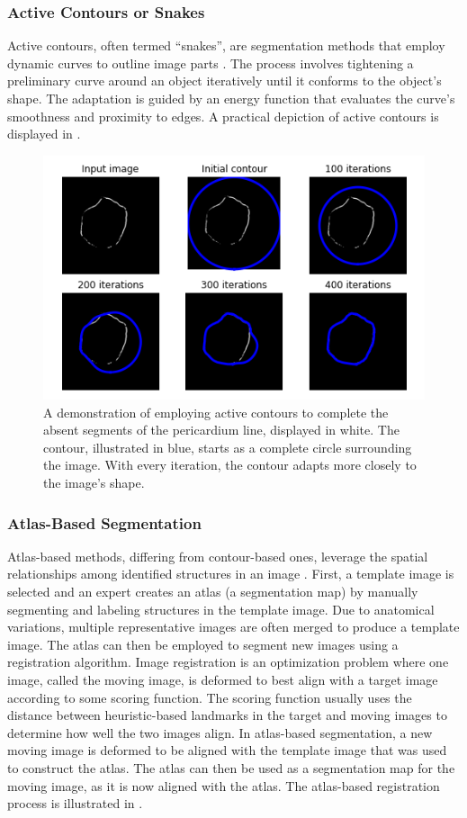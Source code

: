 \subsubsection{Active Contours or Snakes}

Active contours, often termed ``snakes'', are segmentation methods that employ dynamic curves to outline image parts \citep{Kass1988}. The process involves tightening a preliminary curve around an object iteratively until it conforms to the object's shape. The adaptation is guided by an energy function that evaluates the curve's smoothness and proximity to edges. A practical depiction of active contours is displayed in .

 \begin{figure}[h!]
 \centering
 \includegraphics[width=0.65\linewidth]{images/active_contour.png}
 \caption{A demonstration of employing active contours to complete the absent segments of the pericardium line, displayed in white. The contour, illustrated in blue, starts as a complete circle surrounding the image. With every iteration, the contour adapts more closely to the image's shape. \cite{bencevicRecentProgressEpicardial2022}}
 \label{fig:active-contour}
 \end{figure}

\subsubsection{Atlas-Based Segmentation}

Atlas-based methods, differing from contour-based ones, leverage the spatial relationships among identified structures in an image \citep{Rohlfing2005}. First, a template image is selected and an expert creates an atlas (a segmentation map) by manually segmenting and labeling structures in the template image. Due to anatomical variations, multiple representative images are often merged to produce a template image. The atlas can then be employed to segment new images using a registration algorithm. Image registration is an optimization problem where one image, called the moving image, is deformed to best align with a target image according to some scoring function. The scoring function usually uses the distance between heuristic-based landmarks in the target and moving images to determine how well the two images align. In atlas-based segmentation, a new moving image is deformed to be aligned with the template image that was used to construct the atlas. The atlas can then be used as a segmentation map for the moving image, as it is now aligned with the atlas. The atlas-based registration process is illustrated in .

